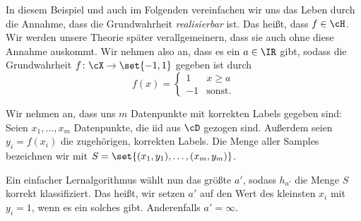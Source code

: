\documentclass[language=ngerman,algolist,acrolist]{TemplateLecture}
\begin{document}
In diesem Beispiel und auch im Folgenden vereinfachen wir uns das Leben durch die Annahme, dass die Grundwahrheit \emph{realisierbar} ist. Das heißt, dass $f \in \cH$. Wir werden unsere Theorie später verallgemeinern, dass sie auch ohne diese Annahme auskommt. Wir nehmen also an, dass es ein $a \in \IR$ gibt, sodass die Grundwahrheit $f \colon \cX \to \set{-1, 1}$ gegeben ist durch
\begin{equation*}
    f(x) = \begin{cases}
        1 & x \geq a \\
        -1 & \text{sonst}.
    \end{cases}
\end{equation*}

Wir nehmen an, dass uns $m$ Datenpunkte mit korrekten Labels gegeben sind: Seien $x_1, \dots , x_m$ Datenpunkte, die \ac{iid} aus $\cD$ gezogen sind. Außerdem seien $y_i = f(x_i)$ die zugehörigen, korrekten Labels. Die Menge aller Samples bezeichnen wir mit $S = \set{(x_1, y_1), \dots ,(x_m, y_m)}$.

Ein einfacher Lernalgorithmus wählt nun das größte $a'$, sodass $h_{a'}$ die Menge $S$ korrekt klassifiziert. Das heißt, wir setzen $a'$ auf den Wert des kleinsten $x_i$ mit $y_i = 1$, wenn es ein solches gibt. Anderenfalls $a' = \infty$.
\end{document}
